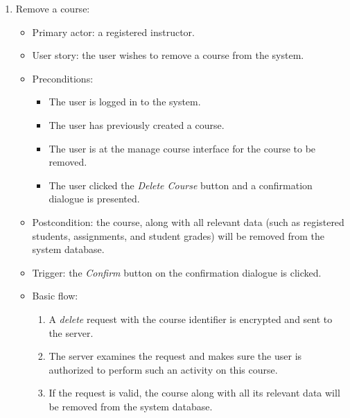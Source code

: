 \begin{enumerate}
\item Remove a course:
\begin{itemize}
    \item Primary actor: a registered instructor.
    \item User story: the user wishes to remove a course from the system.
    \item Preconditions:
        \begin{itemize}
            \item The user is logged in to the system.
            \item The user has previously created a course.
            \item The user is at the manage course interface for the course
                to be removed.
            \item The user clicked the \emph{Delete Course} button and a
                confirmation dialogue is presented.
        \end{itemize}
    \item Postcondition:
        the course, along with all relevant data (such as registered students,
        assignments, and student grades) will be removed from the system
        database.
    \item Trigger: the \emph{Confirm} button on the confirmation dialogue is
        clicked.
    \item Basic flow:
        \begin{enumerate}
            \item A \emph{delete} request with the course identifier is encrypted
                and sent to the server.
            \item The server examines the request and makes sure the user is
                authorized to perform such an activity on this course.
            \item If the request is valid, the course along with all its
                relevant data will be removed from the system database.
        \end{enumerate}
\end{itemize}


\end{enumerate}

